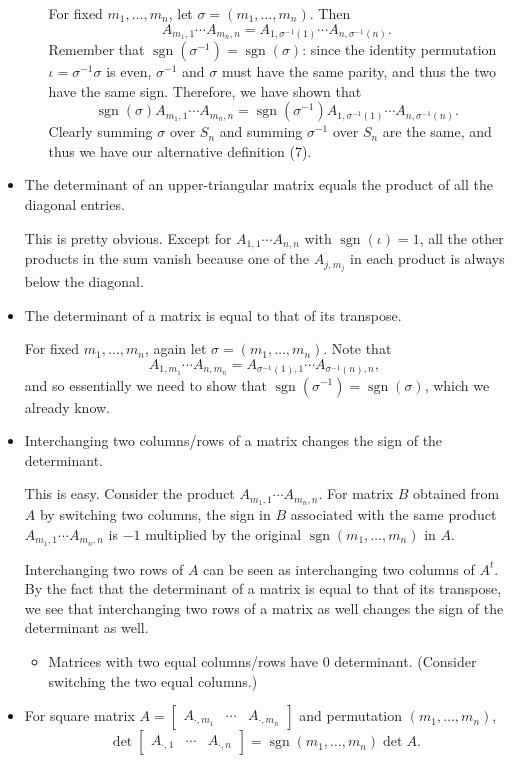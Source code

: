 \documentclass[11pt]{article}
\newcommand{\sgn}{\operatorname{sgn}}
\begin{document}
\begin{itemize}
\begin{itemize}
        For fixed $m_1,\dots,m_n$, let $\sigma = (m_1,\dots,m_n)$. Then \[A_{m_1,1}\cdots A_{m_n,n} = A_{1,\sigma^{-1}(1)}\cdots A_{n,\sigma^{-1}(n)}.\] Remember that $\sgn(\sigma^{-1}) = \sgn(\sigma)$: since the identity permutation $\iota = \sigma^{-1}\sigma$ is even, $\sigma^{-1}$ and $\sigma$ must have the same parity, and thus the two have the same sign. Therefore, we have shown that \[\sgn(\sigma) A_{m_1,1}\cdots A_{m_n,n} = \sgn(\sigma^{-1}) A_{1,\sigma^{-1}(1)}\cdots A_{n,\sigma^{-1}(n)}.\] Clearly summing $\sigma$ over $S_n$ and summing $\sigma^{-1}$ over $S_n$ are the same, and thus we have our alternative definition (7).
    \end{itemize}
    \item The determinant of an upper-triangular matrix equals the product of all the diagonal entries.

    This is pretty obvious. Except for $A_{1,1}\cdots A_{n,n}$ with $\sgn(\iota) = 1$, all the other products in the sum vanish because one of the $A_{j,m_j}$ in each product is always below the diagonal.
    \item The determinant of a matrix is equal to that of its transpose.

    For fixed $m_1,\dots,m_n$, again let $\sigma = (m_1,\dots,m_n)$. Note that \[A_{1,m_1} \cdots A_{n,m_n} = A_{\sigma^{-1}(1),1} \cdots A_{\sigma^{-1}(n),n},\] and so essentially we need to show that $\sgn(\sigma^{-1}) = \sgn(\sigma)$, which we already know.
    \item Interchanging two columns/rows of a matrix changes the sign of the determinant.

    This is easy. Consider the product $A_{m_1,1} \cdots A_{m_n,n}$. For matrix $B$ obtained from $A$ by switching two columns, the sign in $B$ associated with the same product $A_{m_1,1} \cdots A_{m_n,n}$ is $-1$ multiplied by the original $\sgn(m_1,\dots,m_n)$ in $A$.

    Interchanging two rows of $A$ can be seen as interchanging two columns of $A^t$. By the fact that the determinant of a matrix is equal to that of its transpose, we see that interchanging two rows of a matrix as well changes the sign of the determinant as well.
    \begin{itemize}
        \item Matrices with two equal columns/rows have 0 determinant. (Consider switching the two equal columns.)
    \end{itemize}
    \item For square matrix $A = \begin{bmatrix}
        A_{\cdot,m_1} & \cdots & A_{\cdot,m_n}
    \end{bmatrix}$ and permutation $(m_1,\dots,m_n)$, \[\det \begin{bmatrix}
        A_{\cdot,1} & \cdots & A_{\cdot,n}
    \end{bmatrix} = \sgn(m_1,\dots,m_n) \det A.\]


\end{itemize}
\end{document}
